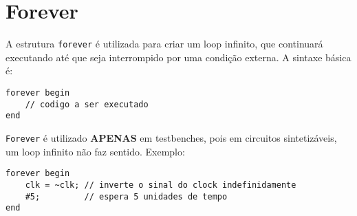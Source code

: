 \documentclass{article}
\begin{document}
\section*{Forever}

A estrutura \texttt{forever} é utilizada para criar um loop infinito, que continuará executando até que seja interrompido por uma condição externa. A sintaxe básica é:

\begin{lstlisting}
forever begin
    // codigo a ser executado
end
\end{lstlisting}

\texttt{Forever} é utilizado \textbf{APENAS} em testbenches, pois em circuitos sintetizáveis, um loop infinito não faz sentido. Exemplo:

\begin{lstlisting}
forever begin
    clk = ~clk; // inverte o sinal do clock indefinidamente
    #5;         // espera 5 unidades de tempo
end
\end{lstlisting}
\end{document}
